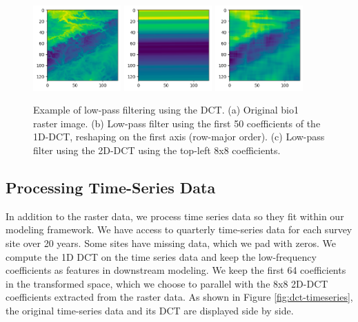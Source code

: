 \begin{figure}
  \centering
  \includegraphics[width=0.3\textwidth]{figures/dct-original.png}
  \hfill
  \includegraphics[width=0.3\textwidth]{figures/dct-1d-lowpass.png}
  \hfill
  \includegraphics[width=0.3\textwidth]{figures/dct-2d-lowpass.png}
  \caption{
    Example of low-pass filtering using the DCT.
    (a) Original bio1 raster image.
    (b) Low-pass filter using the first 50 coefficients of the 1D-DCT, reshaping on the first axis (row-major order).
    (c) Low-pass filter using the 2D-DCT using the top-left 8x8 coefficients.
  }
  \label{fig:dct-lowpass}
\end{figure}

\subsection{Processing Time-Series Data}

In addition to the raster data, we process time series data so they fit within our modeling framework.
We have access to quarterly time-series data for each survey site over 20 years.
Some sites have missing data, which we pad with zeros.
We compute the 1D DCT on the time series data and keep the low-frequency coefficients as features in downstream modeling.
We keep the first 64 coefficients in the transformed space, which we choose to parallel with the 8x8 2D-DCT coefficients extracted from the raster data.
As shown in Figure \ref{fig:dct-timeseries}, the original time-series data and its DCT are displayed side by side.


